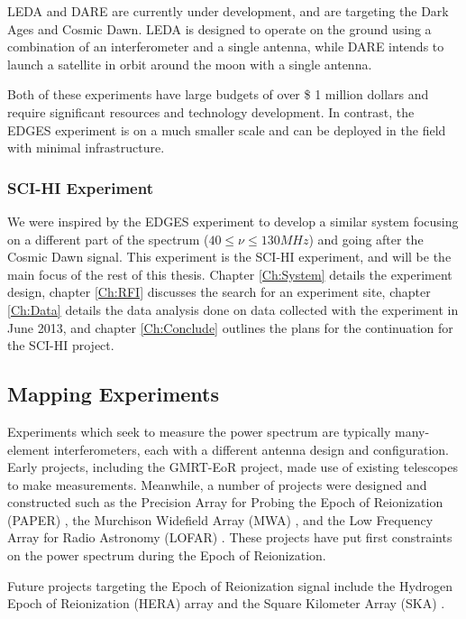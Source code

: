 LEDA \cite{leda}\cite{bernardi_2014} and DARE \cite{burns_2011} are currently under development, and are targeting the Dark Ages and Cosmic Dawn. LEDA is designed to operate on the ground using a combination of an interferometer and a single antenna, while DARE intends to launch a satellite in orbit around the moon with a single antenna. 

Both of these experiments have large budgets of over \$ 1 million dollars and require significant resources and technology development. In contrast, the EDGES experiment is on a much smaller scale and can be deployed in the field with minimal infrastructure. 

\subsubsection{SCI-HI Experiment}
We were inspired by the EDGES experiment to develop a similar system focusing on a different part of the \cm spectrum ($40 \leq \nu \leq 130 MHz$) and going after the Cosmic Dawn signal. This experiment is the SCI-HI experiment, and will be the main focus of the rest of this thesis. Chapter \ref{Ch:System} details the experiment design, chapter \ref{Ch:RFI} discusses the search for an experiment site, chapter \ref{Ch:Data} details the data analysis done on data collected with the experiment in June 2013, and chapter \ref{Ch:Conclude} outlines the plans for the continuation for the SCI-HI project. 

\subsection{Mapping Experiments}
Experiments which seek to measure the \cm power spectrum are typically many-element interferometers, each with a different antenna design and configuration. Early projects, including the GMRT-EoR \cite{paciga_2013} project, made use of existing telescopes to make measurements. Meanwhile, a number of projects were designed and constructed such as the Precision Array for Probing the Epoch of Reionization (PAPER) \cite{pober_2013}\cite{jacobs_2014}, the Murchison Widefield Array (MWA) \cite{bernardi_2013}\cite{tingay_2012}, and the Low Frequency Array for Radio Astronomy (LOFAR) \cite{jelic_2014}\cite{lofar}. These projects have put first constraints on the power spectrum during the Epoch of Reionization. 

Future projects targeting the Epoch of Reionization signal include the Hydrogen Epoch of Reionization (HERA) \cite{hera}\cite{bernardi_2014} array and the Square Kilometer Array (SKA) \cite{ska}.

